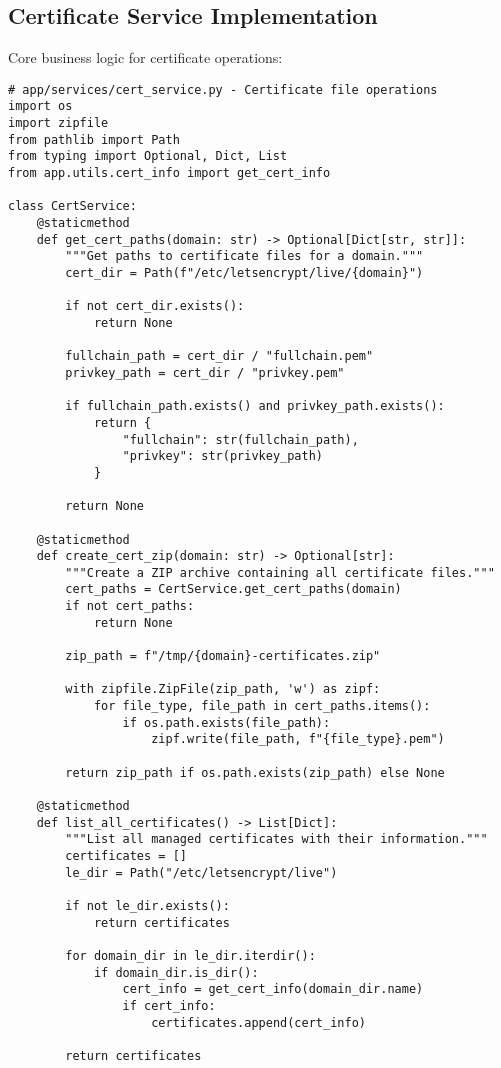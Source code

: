 \subsection{Certificate Service Implementation}

Core business logic for certificate operations:

\begin{verbatim}
# app/services/cert_service.py - Certificate file operations
import os
import zipfile
from pathlib import Path
from typing import Optional, Dict, List
from app.utils.cert_info import get_cert_info

class CertService:
    @staticmethod
    def get_cert_paths(domain: str) -> Optional[Dict[str, str]]:
        """Get paths to certificate files for a domain."""
        cert_dir = Path(f"/etc/letsencrypt/live/{domain}")
        
        if not cert_dir.exists():
            return None
            
        fullchain_path = cert_dir / "fullchain.pem"
        privkey_path = cert_dir / "privkey.pem"
        
        if fullchain_path.exists() and privkey_path.exists():
            return {
                "fullchain": str(fullchain_path),
                "privkey": str(privkey_path)
            }
        
        return None
    
    @staticmethod
    def create_cert_zip(domain: str) -> Optional[str]:
        """Create a ZIP archive containing all certificate files."""
        cert_paths = CertService.get_cert_paths(domain)
        if not cert_paths:
            return None
            
        zip_path = f"/tmp/{domain}-certificates.zip"
        
        with zipfile.ZipFile(zip_path, 'w') as zipf:
            for file_type, file_path in cert_paths.items():
                if os.path.exists(file_path):
                    zipf.write(file_path, f"{file_type}.pem")
        
        return zip_path if os.path.exists(zip_path) else None
    
    @staticmethod
    def list_all_certificates() -> List[Dict]:
        """List all managed certificates with their information."""
        certificates = []
        le_dir = Path("/etc/letsencrypt/live")
        
        if not le_dir.exists():
            return certificates
            
        for domain_dir in le_dir.iterdir():
            if domain_dir.is_dir():
                cert_info = get_cert_info(domain_dir.name)
                if cert_info:
                    certificates.append(cert_info)
                    
        return certificates
\end{verbatim}

